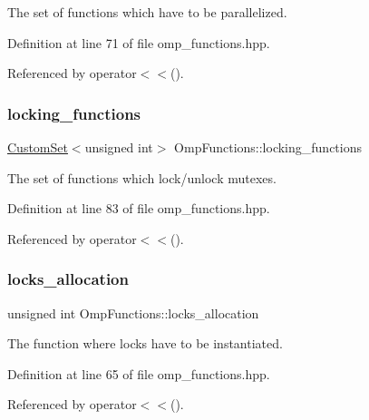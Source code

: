 The set of functions which have to be parallelized. 



Definition at line 71 of file omp\+\_\+functions.\+hpp.



Referenced by operator$<$$<$().

\mbox{\label{classOmpFunctions_a739bd58cfaf8af50e4359b78f5e310b2}} 
\subsubsection{\texorpdfstring{locking\+\_\+functions}{locking\_functions}}
{\footnotesize\ttfamily \hyperlink{custom__set_8hpp_a615bc2f42fc38a4bb1790d12c759e86f}{Custom\+Set}$<$unsigned int$>$ Omp\+Functions\+::locking\+\_\+functions}



The set of functions which lock/unlock mutexes. 



Definition at line 83 of file omp\+\_\+functions.\+hpp.



Referenced by operator$<$$<$().

\mbox{\label{classOmpFunctions_a51202abb9e5888fbbbfe347b379e2e6a}} 
\subsubsection{\texorpdfstring{locks\+\_\+allocation}{locks\_allocation}}
{\footnotesize\ttfamily unsigned int Omp\+Functions\+::locks\+\_\+allocation}



The function where locks have to be instantiated. 



Definition at line 65 of file omp\+\_\+functions.\+hpp.



Referenced by operator$<$$<$().

\mbox{\label{classOmpFunctions_a8e7758f4f8eccd4a2c67a9f486c1baae}} 
